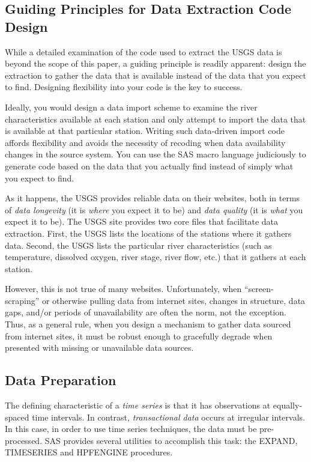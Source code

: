 \documentclass[10pt]{sugconf-ish}
\begin{document}
\subsection{Guiding Principles for Data Extraction Code Design}

While a detailed examination of the code used to extract the USGS data is beyond the scope of this paper, a guiding principle is readily apparent: design the extraction to gather the data that is available instead of the data that you expect to find. Designing flexibility into your code is the key to success.

Ideally, you would design a data import scheme to examine the river characteristics available at each station and only attempt to import the data that is available at that particular station. Writing such data-driven import code affords flexibility and avoids the necessity of recoding when data availability changes in the source system. You can use the SAS macro language judiciously to generate code based on the data that you actually find instead of simply what you expect to find.

As it happens, the USGS provides reliable data on their websites, both in terms of \emph{data longevity} (it is \emph{where} you expect it to be) and \emph{data quality} (it is \emph{what} you expect it to be). The USGS site provides two core files that facilitate data extraction. First, the USGS lists the locations of the stations where it gathers data. Second, the USGS lists the particular river characteristics (such as temperature, dissolved oxygen, river stage, river flow, etc.) that it gathers at each station.

However, this is not true of many websites. Unfortunately, when ``screen-scraping'' or otherwise pulling data from internet sites, changes in structure, data gaps, and/or periods of unavailability are often the norm, not the exception. Thus, as a general rule, when you design a mechanism to gather data sourced from internet sites, it must be robust enough to gracefully degrade when presented with missing or unavailable data sources.



\subsection{Data Preparation}
The defining characteristic of a \emph{time series} is that it has observations at equally-spaced time intervals. In contrast, \emph{transactional data} occurs at irregular intervals. In this case, 
in order to use time series techniques, the data must be pre-processed. SAS provides several utilities to accomplish this task: the EXPAND, TIMESERIES and HPFENGINE procedures.
\end{document}
